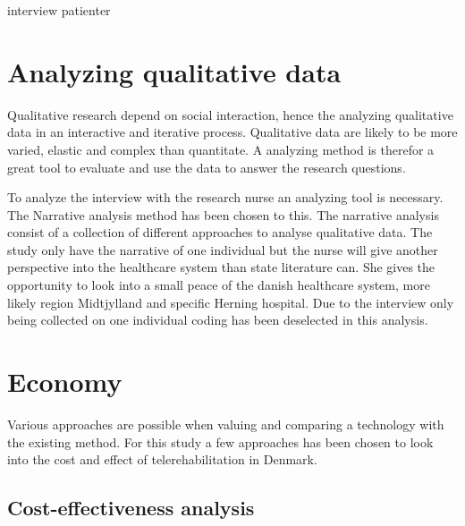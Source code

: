 interview patienter

\section{Analyzing qualitative data}


Qualitative research depend on social interaction, hence the analyzing qualitative data in an interactive and iterative process. Qualitative data are likely to be more varied, elastic and complex than quantitate. A analyzing method is therefor a great tool to evaluate and use the data to answer the research questions. 

To analyze the interview with the research nurse an analyzing tool is necessary. The Narrative analysis method has been chosen to this. The narrative analysis consist of a collection of different approaches to analyse qualitative data. 
 The study only have the narrative of one individual but the nurse will give another perspective into the healthcare system than state literature can. She gives the opportunity to look into a small peace of the danish healthcare system, more likely region Midtjylland and specific Herning hospital. Due to the interview only being collected on one individual coding has been deselected in this analysis.  


\section{Economy}


Various approaches are possible when valuing and comparing a technology with the existing method. For this study a few approaches has been chosen to look into the cost and effect of telerehabilitation in Denmark.

\subsection{Cost-effectiveness analysis}



